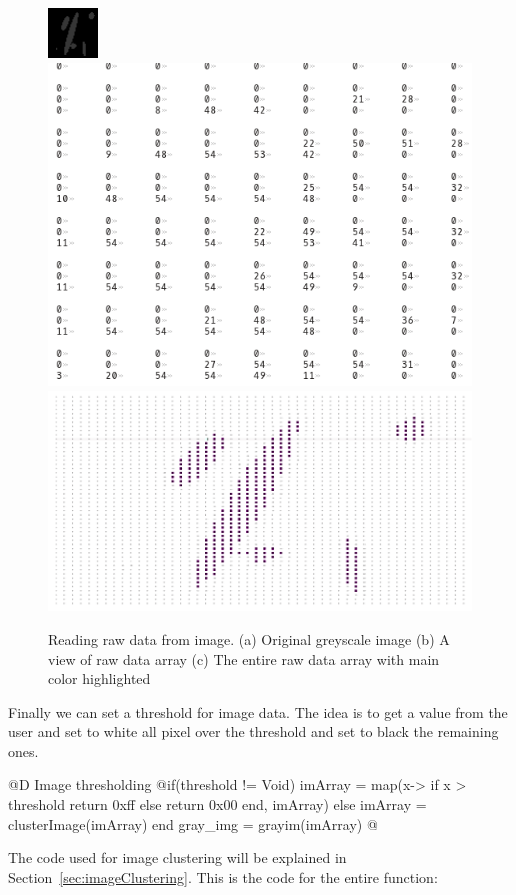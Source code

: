 \documentclass[11pt,oneside]{article}	%
\begin{document}
\begin{figure}[htb] %
   \centering
   \includegraphics[width=0.27\linewidth]{images/grayscalesample.png}
   \includegraphics[width=0.47\linewidth]{images/imArraypart.png} \\
   
   \includegraphics[width=0.67\linewidth]{images/imArrayfull.png} \hfill
   \caption{Reading raw data from image. (a) Original greyscale image (b) A view of raw data array (c) The entire raw data array with main color highlighted}
   \label{fig:rawImage}
\end{figure}

Finally we can set a threshold for image data. The idea is to get a value from the user and set to white all pixel over the threshold and set to black the remaining ones.

@D Image thresholding
@{if(threshold != Void)
  imArray = map(x-> if x > threshold return 0xff else return 0x00 end, imArray)
else
  imArray = clusterImage(imArray)
end
gray_img = grayim(imArray) @}


The code used for image clustering will be explained in Section~\ref{sec:imageClustering}. 
This is the code for the entire function:
\end{document}
